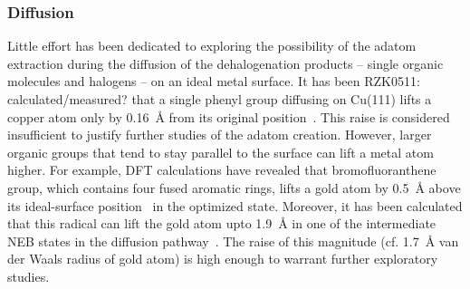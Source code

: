 \documentclass[%
 reprint,
 amsmath,amssymb,
 aps,
prb,
floatfix,
]{revtex4-2}
\newcommand{\lock}{\color{red}}
\newcommand{\lock}{\color{red}}
\newcommand{\comm}{\color{Purple}} %
\begin{document}
\ifdefined\INTERNAL

\subsubsection{Diffusion}


\fi

{\lock

Little effort has been dedicated to exploring the possibility of the adatom extraction during the diffusion of the dehalogenation products  -- single organic molecules and halogens -- on an ideal metal surface. 
%
%
It has been {\comm RZK0511: calculated/measured?} that a single phenyl group diffusing on Cu(111) lifts a copper atom only by \SI{0.16}{\angstrom} from its original position~\cite{pccp2010}. 
This raise is considered insufficient to justify further studies of the adatom creation.
However, larger organic groups that tend to stay parallel to the surface can lift a metal atom higher. 
For example, DFT calculations have revealed that bromofluoranthene group, which contains four fused aromatic rings, lifts a gold atom by \SI{0.5}{\angstrom} above its ideal-surface position~\cite{jpcc2018} in the optimized state. 
Moreover, it has been calculated that this radical can lift the gold atom upto \SI{1.9}{\angstrom} in one of the intermediate NEB states in the diffusion pathway~\cite{jpcc2018}.
The raise of this magnitude (cf. \SI{1.7}{\angstrom} van der Waals radius of gold atom) is high enough to warrant further exploratory studies.


}
\end{document}
